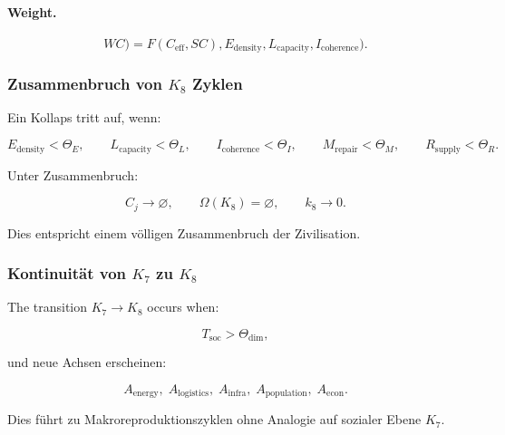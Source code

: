 \paragraph{Weight.}
\[
WC)
 =
 F(C_{\mathrm{eff}},
SC),
   E_{\mathrm{density}},
   L_{\mathrm{capacity}},
   I_{\mathrm{coherence}}).
\]

\subsubsection{Zusammenbruch von \texorpdfstring{$K_8$}{K_8} Zyklen}

Ein Kollaps tritt auf, wenn:

\[
  E_{\mathrm{density}} < \Theta_E,\qquad
  L_{\mathrm{capacity}} < \Theta_L,\qquad
  I_{\mathrm{coherence}} < \Theta_I,\qquad
  M_{\mathrm{repair}} < \Theta_M,\qquad
  R_{\mathrm{supply}} < \Theta_R.
\]

Unter Zusammenbruch:

\[
  C_j \to \varnothing,\qquad
  \Omega(K_8)=\varnothing,\qquad
  k_8\to 0.
\]

Dies entspricht einem völligen Zusammenbruch der Zivilisation.

\subsubsection{Kontinuität von \texorpdfstring{$K_7$}{K_7} zu \texorpdfstring{$K_8$}{K_8}}

The transition $K_7\to K_8$ occurs when:

\[
  T_{\mathrm{soc}} > \Theta_{\mathrm{dim}},
\]

und neue Achsen erscheinen:

\[
  A_{\mathrm{energy}},\;
  A_{\mathrm{logistics}},\;
  A_{\mathrm{infra}},\;
  A_{\mathrm{population}},\;
  A_{\mathrm{econ}}.
\]

Dies führt zu Makroreproduktionszyklen ohne Analogie auf sozialer Ebene
$K_7$.
